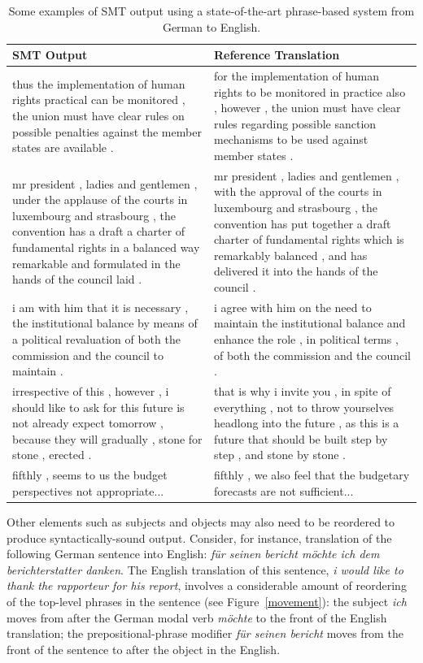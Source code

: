 \documentclass[10pt]{report}
\theoremstyle{plain}
\begin{document}
{\begin{table}
\caption{Some examples of SMT output using a state-of-the-art
phrase-based system from German to English.}
\begin{center}
\begin{tabular}{p{2.25in}p{2.25in}}
{\bf SMT Output} & {\bf Reference Translation}\\
\hline
thus the implementation of human rights practical can be monitored , the union must have clear rules on possible penalties against the member states are available . & for the implementation of human rights to be monitored in practice also , however , the union must have clear rules regarding possible sanction mechanisms to be used against member states . \\
\hline
mr president , ladies and gentlemen , under the applause of the courts in luxembourg and strasbourg , the convention has a draft a charter of fundamental rights in a balanced way remarkable and formulated in the hands of the council laid . & mr president , ladies and gentlemen , with the approval of the courts in luxembourg and strasbourg , the convention has put together a draft charter of fundamental rights which is remarkably balanced , and has delivered it into the hands of the council . \\
\hline
i am with him that it is necessary , the institutional balance by means of a political revaluation of both the commission and the council to maintain . & i agree with him on the need to maintain the institutional balance and enhance the role , in political terms , of both the commission and the council . \\
\hline
irrespective of this , however , i should like to ask for this future is not already expect tomorrow , because they will gradually , stone for stone , erected . & that is why i invite you , in spite of everything , not to throw yourselves headlong into the future , as this is a future that should be built step by step , and stone by stone . \\
\hline
fifthly , seems to us the budget perspectives not appropriate... & fifthly , we also feel that the budgetary forecasts are not sufficient... \\
\hline
\end{tabular}
\end{center}
\label{SMTexamples}
\end{table}%

Other elements such as subjects and objects may also need to be
reordered to produce syntactically-sound output. Consider, for
instance, translation of the following German sentence into English:
{\em f\"{u}r seinen bericht m\"{o}chte ich dem berichterstatter
danken}. The English translation of this sentence, {\em i would like
to thank the rapporteur for his report}, involves a considerable
amount of reordering of the top-level phrases in the sentence (see
Figure~\ref{movement}): the subject {\em ich} moves from after the
German modal verb {\em m\"{o}chte} to the front of the English
translation; the prepositional-phrase modifier {\em f\"{u}r seinen
bericht} moves from the front of the sentence to after the object in
the English.

}
\end{document}
